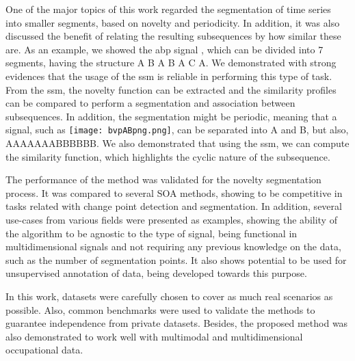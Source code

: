 One of the major topics of this work regarded the segmentation of time series into smaller segments, based on novelty and periodicity. In addition, it was also discussed the benefit of relating the resulting subsequences by how similar these are. As an example, we showed the \gls{abp} signal , which can be divided into 7 segments, having the structure \textcolor{mygreen3}{A} \textcolor{mymagenta}{B} \textcolor{mygreen3}{A} \textcolor{mymagenta}{B} \textcolor{mygreen3}{A} \textcolor{myblue5}{C} \textcolor{mygreen3}{A}. We demonstrated with strong evidences that the usage of the \gls{ssm} is reliable in performing this type of task. From the \gls{ssm}, the novelty function can be extracted and the similarity profiles can be compared to perform a segmentation and association between subsequences. In addition, the segmentation might be periodic, meaning that a signal, such as \texttt{[image: bvpABpng.png]}, can be separated into \textcolor{myblue}{A} and \textcolor{mygreen}{B}, but also, \textcolor{myblue}{AAAAAAA}\textcolor{mygreen}{BBBBBB}. We also demonstrated that using the \gls{ssm}, we can compute the similarity function, which highlights the cyclic nature of the subsequence.
\par
The performance of the method was validated for the novelty segmentation  process. It was compared to several SOA methods, showing to be competitive in tasks related with change point detection and segmentation. In addition, several use-cases from various fields were presented as examples, showing the ability of the algorithm to be agnostic to the type of signal, being functional in multidimensional signals and not requiring any previous knowledge on the data, such as the number of segmentation points. It also shows potential to be used for unsupervised annotation of data, being developed towards this purpose.
\par
In this work, datasets were carefully chosen to cover as much real scenarios as possible. Also, common benchmarks were used to validate the methods to guarantee independence from private datasets. Besides, the proposed method was also demonstrated to work well with multimodal and multidimensional occupational data.
\par
